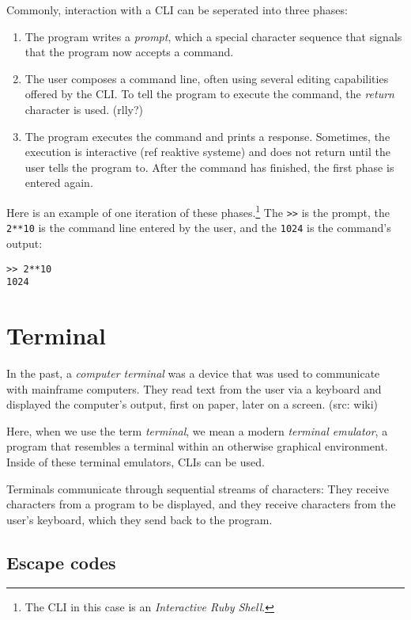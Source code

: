 \documentclass[twoside]{scrreprt}
\begin{document}
Commonly, interaction with a \textsc{CLI} can be seperated into three phases:

\begin{enumerate}
    \item The program writes a \emph{prompt}, which a special character sequence that signals that the program now accepts a command.
    \item The user composes a command line, often using several editing capabilities offered by the CLI. To tell the program to execute the command, the \emph{return} character is used. (rlly?)
    \item The program executes the command and prints a response. Sometimes, the execution is interactive (ref reaktive systeme) and does not return until the user tells the program to. After the command has finished, the first phase is entered again.
\end{enumerate}

Here is an example of one iteration of these phases.\footnote{The \textsc{CLI} in this case is an \emph{Interactive Ruby Shell}.} The \texttt{>\->} is the prompt, the \texttt{2**10} is the command line entered by the user, and the \texttt{1024} is the command's output:

\begin{lstlisting}
>> 2**10
1024
\end{lstlisting}

\section{Terminal}

In the past, a \emph{computer terminal} was a device that was used to communicate with mainframe computers. They read text from the user via a keyboard and displayed the computer's output, first on paper, later on a screen. (src: wiki)

Here, when we use the term \emph{terminal}, we mean a modern \emph{terminal emulator}, a program that resembles a terminal within an otherwise graphical environment. Inside of these terminal emulators, \textsc{CLI}s can be used.

Terminals communicate through sequential streams of characters: They receive characters from a program to be displayed, and they receive characters from the user's keyboard, which they send back to the program.

\subsection{Escape codes}
\end{document}
